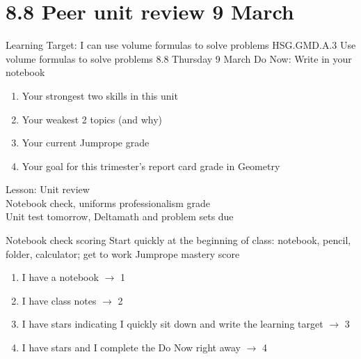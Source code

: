 \section{8.8 Peer unit review \hfill 9 March \,}
\begin{frame}{Learning Target: I can use volume formulas to solve problems}
  {HSG.GMD.A.3 Use volume formulas to solve problems \hfill \alert{8.8 Thursday 9 March}}
    Do Now: Write in your notebook
    \begin{enumerate}
      \item Your strongest two skills in this unit
      \item Your weakest 2 topics (and why)
      \item Your current Jumprope grade
      \item Your goal for this trimester's report card grade in Geometry
    \end{enumerate} \bigskip
    Lesson: Unit review \\
    Notebook check, uniforms professionalism grade \\[0.5cm]
    \alert{Unit test tomorrow}, Deltamath and problem sets due
\end{frame}

\begin{frame}{Notebook check scoring}
  {Start quickly at the beginning of class: notebook, pencil, folder, calculator; get to work}
    Jumprope mastery score
    \begin{enumerate}
      \item I have a notebook $\rightarrow$ 1
      \item I have class notes $\rightarrow$ 2
      \item I have stars indicating I quickly sit down and write the learning target $\rightarrow$ 3
      \item I have stars and I complete the Do Now right away $\rightarrow$ 4
    \end{enumerate} \bigskip
\end{frame}

